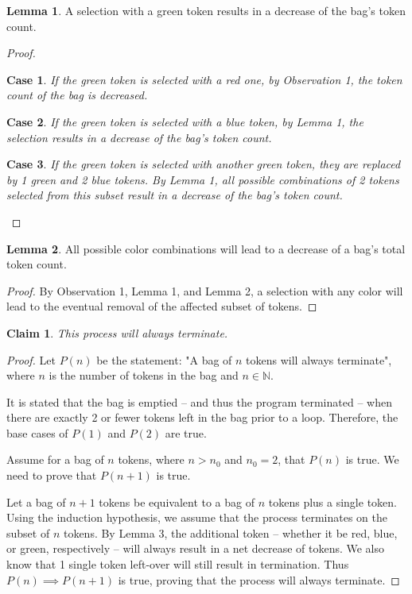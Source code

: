 \documentclass[11pt]{article}
\theoremstyle{definition}
\newtheorem{lemma}{Lemma}
\theoremstyle{plain}
\newtheorem{claim}{Claim}
\theoremstyle{indented-remark}
\newtheorem{case}{Case}
\theoremstyle{indented-proof}
\begin{document}
\setcounter{case}{0}
\begin{lemma}
A selection with a green token results in a decrease of the bag's token count.
\begin{proof}
\begin{case}
If the green token is selected with a red one, by Observation 1, the token count of the bag is decreased. 
\end{case}
\begin{case}
If the green token is selected with a blue token, by Lemma 1, the selection results in a decrease of the bag's token count.
\end{case}
\begin{case}
If the green token is selected with another green token, they are replaced by 1 green and 2 blue tokens. By Lemma 1, all possible combinations of 2 tokens selected from this subset result in a decrease of the bag's token count.
\end{case}
\end{proof}
\end{lemma}

\begin{lemma}
All possible color combinations will lead to a decrease of a bag's total token count.
\begin{proof}
By Observation 1, Lemma 1, and Lemma 2, a selection with any color will lead to the eventual removal of the affected subset of tokens.
\end{proof}
\end{lemma}

\setcounter{case}{0}
\begin{claim}
This process will always terminate.
\end{claim}

\begin{proof}
Let $P(n)$ be the statement: "A bag of $n$ tokens will always terminate", where $n$ is the number of tokens in the bag and $n \in \mathbb{N}$. \newline

\noindent It is stated that the bag is emptied -- and thus the program terminated -- when there are exactly 2 or fewer tokens left in the bag prior to a loop. Therefore, the base cases of $P(1)$ and $P(2)$ are true. \newline

\noindent Assume for a bag of $n$ tokens, where $n > n_{0}$ and $n_{0} = 2$, that $P(n)$ is true. We need to prove that $P(n + 1)$ is true. \newline

\noindent Let a bag of $n + 1$ tokens be equivalent to a bag of $n$ tokens plus a single token. Using the induction hypothesis, we assume that the process terminates on the subset of $n$ tokens. By Lemma 3, the additional token -- whether it be red, blue, or green, respectively -- will always result in a net decrease of tokens. We also know that 1 single token left-over will still result in termination. Thus $P(n) \implies P(n + 1)$ is true, proving that the process will always terminate.
\end{proof}
\end{document}
